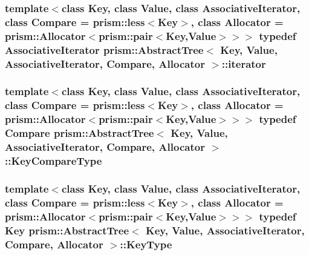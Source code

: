 \subsubsection[{\texorpdfstring{iterator}{iterator}}]{\setlength{\rightskip}{0pt plus 5cm}template$<$class Key, class Value, class Associative\+Iterator, class Compare = prism\+::less$<$\+Key$>$, class Allocator = prism\+::\+Allocator$<$prism\+::pair$<$\+Key,\+Value$>$$>$$>$ typedef {\bf Associative\+Iterator} {\bf prism\+::\+Abstract\+Tree}$<$ Key, Value, {\bf Associative\+Iterator}, Compare, {\bf Allocator} $>$\+::{\bf iterator}}\hypertarget{classprism_1_1_abstract_tree_add0af156a67312ca397d703c531e32fd}{}\label{classprism_1_1_abstract_tree_add0af156a67312ca397d703c531e32fd}
\subsubsection[{\texorpdfstring{Key\+Compare\+Type}{KeyCompareType}}]{\setlength{\rightskip}{0pt plus 5cm}template$<$class Key, class Value, class Associative\+Iterator, class Compare = prism\+::less$<$\+Key$>$, class Allocator = prism\+::\+Allocator$<$prism\+::pair$<$\+Key,\+Value$>$$>$$>$ typedef Compare {\bf prism\+::\+Abstract\+Tree}$<$ Key, Value, {\bf Associative\+Iterator}, Compare, {\bf Allocator} $>$\+::{\bf Key\+Compare\+Type}}\hypertarget{classprism_1_1_abstract_tree_ad26cf2f1010ba3e5bdf74ba773b0afb1}{}\label{classprism_1_1_abstract_tree_ad26cf2f1010ba3e5bdf74ba773b0afb1}
\subsubsection[{\texorpdfstring{Key\+Type}{KeyType}}]{\setlength{\rightskip}{0pt plus 5cm}template$<$class Key, class Value, class Associative\+Iterator, class Compare = prism\+::less$<$\+Key$>$, class Allocator = prism\+::\+Allocator$<$prism\+::pair$<$\+Key,\+Value$>$$>$$>$ typedef Key {\bf prism\+::\+Abstract\+Tree}$<$ Key, Value, {\bf Associative\+Iterator}, Compare, {\bf Allocator} $>$\+::{\bf Key\+Type}}\hypertarget{classprism_1_1_abstract_tree_a8e7c15cc5a5b1e475396f04b5c8d6791}{}\label{classprism_1_1_abstract_tree_a8e7c15cc5a5b1e475396f04b5c8d6791}
